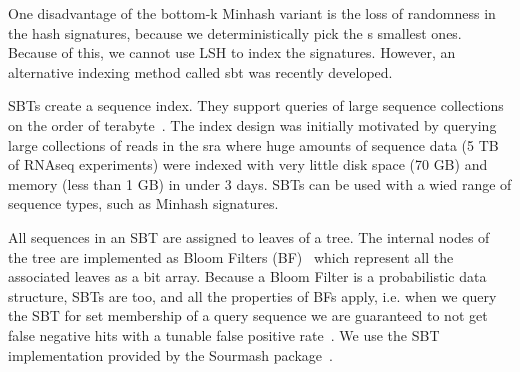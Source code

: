 One disadvantage of the bottom-k Minhash variant is the loss of randomness in the hash signatures, because we deterministically pick the s smallest ones. Because of this, we cannot use LSH to index the signatures. However, an alternative indexing method called \gls{sbt} was recently developed.

SBTs create a sequence index. They support queries of large sequence collections on the order of terabyte~\cite{Sun2016-gi, Solomon2015-dh}. The index design was initially motivated by querying large collections of reads in the \gls{sra} where huge amounts of sequence data (5 TB of RNAseq experiments) were indexed with very little disk space (70 GB) and memory (less than 1 GB) in under 3 days. SBTs can be used with a wied range of sequence types, such as Minhash signatures.

All sequences in an SBT are assigned to leaves of a tree. The internal nodes of the tree are implemented as Bloom Filters (BF)~\cite{Bloom1970-ey} which represent all the associated leaves as a bit array. Because a Bloom Filter is a probabilistic data structure, SBTs are too, and all the properties of BFs apply, i.e. when we query the SBT for set membership of a query sequence we are guaranteed to not get false negative hits with a tunable false positive rate~\cite{Broder2004-ya}. We use the SBT implementation provided by the Sourmash package~\cite{Brown2016-gd}.
